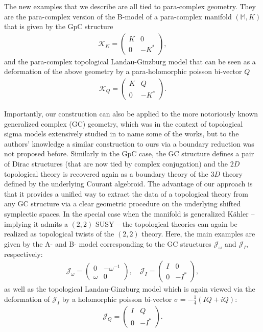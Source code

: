 \documentclass{article}
\newcommand{\JJ}{\mathcal{J}}
\newcommand{\KK}{\mathcal{K}}
\newcommand{\Mb}{\mathbb{M}}
\theoremstyle{definition}
\theoremstyle{remark}
\begin{document}
The new examples that we describe are all tied to para-complex geometry. They are the para-complex version of the B-model of a para-complex manifold $(\Mb,K)$ that is given by the GpC structure
\begin{align*}
\KK_K=
\begin{pmatrix}
K & 0 \\
0 & -K^*
\end{pmatrix},
\end{align*}
and the para-complex topological Landau-Ginzburg model that can be seen as a deformation of the above geometry by a para-holomorphic poisson bi-vector $Q$
\begin{align*}
\KK_Q=
\begin{pmatrix}
K & Q \\
0 & -K^*
\end{pmatrix}.
\end{align*}

Importantly, our construction can also be applied to the more notoriously known generalized complex (GC) geometry, which was in the context of topological sigma models extensively studied in \cite{Zucchini:2004ta,Ikeda:2004cm,Kapustin:2004gv,Pestun:2006rj,Cattaneo:2009zx} to name some of the works, but to the authors' knowledge a similar construction to ours via a boundary reduction was not proposed before. Similarly in the GpC case, the GC structure defines a pair of Dirac structures (that are now tied by complex conjugation) and the $2D$ topological theory is recovered again as a boundary theory of the $3D$ theory defined by the underlying Courant algebroid. The advantage of our approach is that it provides a unified way to extract the data of a topological theory from any GC structure via a clear geometric procedure on the underlying shifted symplectic spaces. In the special case when the manifold is generalized K\"ahler \cite{Gualtieri:2003dx,Gualtieri:2010fd} -- implying it admits a $(2,2)$ SUSY --  the topological theories can again be realized as topological twists \cite{Kapustin:2004gv} of the $(2,2)$ theory. Here, the main examples are given by the A- and B- model corresponding to the GC structures $\JJ_\omega$ and $\JJ_I$, respectively:
\begin{align*}
\JJ_\omega=
\begin{pmatrix}
0 & -\omega^{-1} \\
\omega & 0
\end{pmatrix}, \quad
\JJ_I=
\begin{pmatrix}
I & 0 \\
0 & -I^*
\end{pmatrix},
\end{align*}
as well as the topological Landau-Ginzburg model which is again viewed via the deformation of $\JJ_I$ by a holomorphic poisson bi-vector \cite{Gualtieri:2007bq} $\sigma=-\frac{1}{4}(IQ+iQ)$:
\begin{align*}
\JJ_Q=
\begin{pmatrix}
I & Q \\
0 & -I^*
\end{pmatrix}.
\end{align*}
\end{document}
